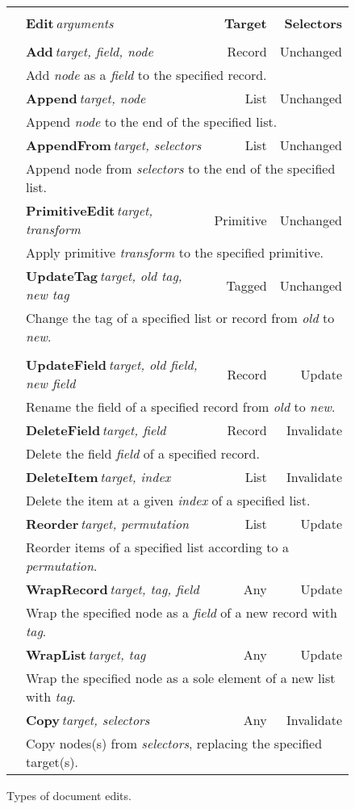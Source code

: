 \documentclass[sigconf]{acmart}
\begin{document}

\begin{figure}
\newcommand{\ektablecol}[6]{
\raisebox{-0.2em}{#1} & \sffamily\small{\bfseries #2}\,\;\textit{\footnotesize target, #3} & \sffamily\footnotesize #4 & \sffamily\footnotesize #5 \\[-0.2em]
&\multicolumn{3}{l|}{\sffamily\footnotesize #6}\\[0.3em]
}
\begin{tabular}{|c|p{13em}rr|}
\hline
\rowcolor{ekgray}
&&&\\[-1em]
\rowcolor{ekgray}
 & \sffamily\small{\bfseries Edit}\;\,\textit{\footnotesize arguments} & \sffamily\footnotesize\bfseries Target & \sffamily\footnotesize\bfseries Selectors \\[0.2em]
\hline
&&&\\[-1em]
\ektablecol{\faPlus}{Add}{field, node}{Record}{Unchanged}
  {Add \textit{node} as a \textit{field} to the specified record.}
\ektablecol{\faAt}{Append}{node}{List}{Unchanged}
  {Append \textit{node} to the end of the specified list.}
\ektablecol{\faPaperclip}{AppendFrom}{selectors}{List}{Unchanged}
  {Append node from \emph{selectors} to the end of the specified list.}
\ektablecol{\faICursor}{PrimitiveEdit}{transform}{Primitive}{Unchanged}
  {Apply primitive \textit{transform} to the specified primitive.}
\ektablecol{\faCode}{UpdateTag}{old tag, new tag}{Tagged}{Unchanged}
  {Change the tag of a specified list or record from \textit{old} to \textit{new}.}
\hline
&&&\\[-1em]
\ektablecol{\faFont}{UpdateField}{old field, new field}{Record}{Update}
  {Rename the field of a specified record from \textit{old} to \textit{new}.}
\ektablecol{\faTimesCircle}{DeleteField}{field}{Record}{Invalidate}
  {Delete the field \textit{field} of a specified record.}
\ektablecol{\faMinusCircle}{DeleteItem}{index}{List}{Invalidate}
  {Delete the item at a given \textit{index} of a specified list.}
\ektablecol{\faSort}{Reorder}{permutation}{List}{Update}
  {Reorder items of a specified list according to a \textit{permutation}.}
\ektablecol{\faFileO}{WrapRecord}{tag, field}{Any}{Update}
  {Wrap the specified node as a \textit{field} of a new record with \textit{tag}.}
\ektablecol{\faListUl}{WrapList}{tag}{Any}{Update}
  {Wrap the specified node as a sole element of a new list with \textit{tag}.}
\ektablecol{\faCopy}{Copy}{selectors}{Any}{Invalidate}
  {Copy nodes(s) from \textit{selectors}, replacing the specified target(s). }
\hline
\end{tabular}
\vspace{-0.5em}
\caption{Types of document edits.}
\label{fig:edits}
\end{figure}
\end{document}
